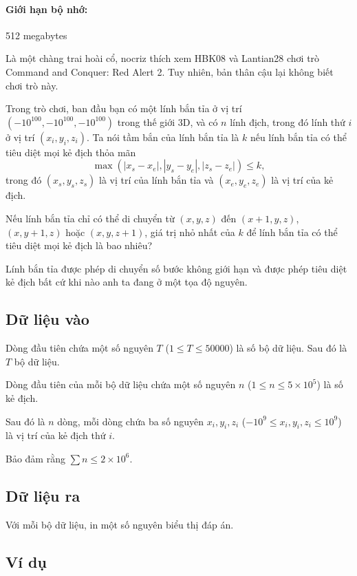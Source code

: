 \documentclass[11pt]{article}
\begin{document}
\paragraph{Giới hạn bộ nhớ:} 512 megabytes

Là một chàng trai hoài cổ, nocriz thích xem HBK08 và Lantian28 chơi trò
Command and Conquer: Red Alert 2. Tuy nhiên, bản thân cậu lại không biết chơi
trò này.

Trong trò chơi, ban đầu bạn có một lính bắn tỉa ở vị trí
\((-10^{100},-10^{100},-10^{100})\) trong thế giới 3D, và có \(n\) lính địch,
trong đó lính thứ \(i\) ở vị trí \((x_i,y_i,z_i)\). Ta nói tầm bắn của lính
bắn tỉa là \(k\) nếu lính bắn tỉa có thể tiêu diệt mọi kẻ địch thỏa mãn
\[
  \max(|x_s-x_e|,|y_s-y_e|,|z_s-z_e|)\le k,
\]
trong đó \((x_s,y_s,z_s)\) là vị trí của lính bắn tỉa và
\((x_e,y_e,z_e)\) là vị trí của kẻ địch.

Nếu lính bắn tỉa chỉ có thể di chuyển từ \((x,y,z)\) đến \((x+1,y,z)\),
\((x,y+1,z)\) hoặc \((x,y,z+1)\), giá trị nhỏ nhất của \(k\) để lính bắn tỉa
có thể tiêu diệt mọi kẻ địch là bao nhiêu?

Lính bắn tỉa được phép di chuyển số bước không giới hạn và được phép tiêu
diệt kẻ địch bất cứ khi nào anh ta đang ở một tọa độ nguyên.

\subsection*{Dữ liệu vào}

Dòng đầu tiên chứa một số nguyên \(T\) (\(1\le T\le 50000\)) là số bộ dữ
liệu. Sau đó là \(T\) bộ dữ liệu.

Dòng đầu tiên của mỗi bộ dữ liệu chứa một số nguyên \(n\) (\(1\le n\le
5\times 10^5\)) là số kẻ địch.

Sau đó là \(n\) dòng, mỗi dòng chứa ba số nguyên \(x_i,y_i,z_i\)
(\(-10^9\le x_i,y_i,z_i\le 10^9\)) là vị trí của kẻ địch thứ \(i\).

Bảo đảm rằng \(\sum n\le 2\times 10^6\).

\subsection*{Dữ liệu ra}

Với mỗi bộ dữ liệu, in một số nguyên biểu thị đáp án.

\subsection*{Ví dụ}
\end{document}
